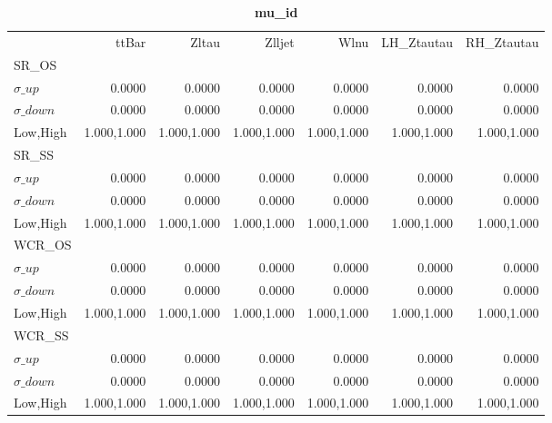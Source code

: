 \documentclass[11pt,oneside,a4paper]{article}
\begin{document}
\begin{table}
\centering
\caption{\bf{mu\_id}}
\begin{tabular}{lrrrrrr}
& ttBar & Zltau & Zlljet & Wlnu & LH\_Ztautau & RH\_Ztautau \\
SR\_OS &  &  &  &  &  &  \\
$\sigma\_up$ & 0.0000 & 0.0000 & 0.0000 & 0.0000 & 0.0000 & 0.0000 \\
$\sigma\_down$ & 0.0000 & 0.0000 & 0.0000 & 0.0000 & 0.0000 & 0.0000 \\
Low,High & 1.000,1.000 & 1.000,1.000 & 1.000,1.000 & 1.000,1.000 & 1.000,1.000 & 1.000,1.000 \\

\hline
SR\_SS &  &  &  &  &  &  \\
$\sigma\_up$ & 0.0000 & 0.0000 & 0.0000 & 0.0000 & 0.0000 & 0.0000 \\
$\sigma\_down$ & 0.0000 & 0.0000 & 0.0000 & 0.0000 & 0.0000 & 0.0000 \\
Low,High & 1.000,1.000 & 1.000,1.000 & 1.000,1.000 & 1.000,1.000 & 1.000,1.000 & 1.000,1.000 \\

\hline
WCR\_OS &  &  &  &  &  &  \\
$\sigma\_up$ & 0.0000 & 0.0000 & 0.0000 & 0.0000 & 0.0000 & 0.0000 \\
$\sigma\_down$ & 0.0000 & 0.0000 & 0.0000 & 0.0000 & 0.0000 & 0.0000 \\
Low,High & 1.000,1.000 & 1.000,1.000 & 1.000,1.000 & 1.000,1.000 & 1.000,1.000 & 1.000,1.000 \\

\hline
WCR\_SS &  &  &  &  &  &  \\
$\sigma\_up$ & 0.0000 & 0.0000 & 0.0000 & 0.0000 & 0.0000 & 0.0000 \\
$\sigma\_down$ & 0.0000 & 0.0000 & 0.0000 & 0.0000 & 0.0000 & 0.0000 \\
Low,High & 1.000,1.000 & 1.000,1.000 & 1.000,1.000 & 1.000,1.000 & 1.000,1.000 & 1.000,1.000 \\

\hline
\end{tabular}
\end{table}
\end{document}
